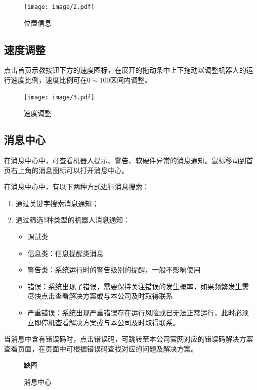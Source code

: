 \begin{figure}[ht]
	\centering
	\texttt{[image: image/2.pdf]}
	\caption{位置信息}
	\label{fig:位置信息}
\end{figure}

\subsection{速度调整}
点击\LM 首页示教按钮下方的速度图标，在展开的拖动条中上下拖动以调整机器人的运行速度比例，速度比例可在$0\sim 100$区间内调整。

\begin{figure}[ht]
	\centering
	\texttt{[image: image/3.pdf]}
	\caption{速度调整}
	\label{fig:速度调整}
\end{figure}

\subsection{消息中心}
在消息中心中，可查看机器人提示、警告、软硬件异常的消息通知。鼠标移动到\LM 首页右上角的消息图标可以打开消息中心。

在消息中心中，有以下两种方式进行消息搜索：
\begin{enumerate}
	\item 通过关键字搜索消息通知；
	\item 通过筛选5种类型的机器人消息通知：
	\begin{itemize}
\item {} 调试类
\item {} 信息类：信息提醒类消息
\item {} 警告类：系统运行时的警告级别的提醒，一般不影响使用
\item {} 错误：系统出现了错误，需要保持关注错误的发生概率，如果频繁发生需尽快点击查看解决方案或与本公司及时取得联系
\item {} 严重错误：系统出现严重错误存在运行风险或已无法正常运行，此时必须立即停机查看解决方案或与本公司及时取得联系。
	\end{itemize}
\end{enumerate}

当消息中含有错误码时，点击错误码，可跳转至本公司官网对应的错误码解决方案查看页面，在页面中可根据错误码查找对应的问题及解决方案。

\begin{figure}[ht]
	\centering
	\color{red}缺图
	\caption{消息中心}
	\label{fig:消息中心}
\end{figure}

